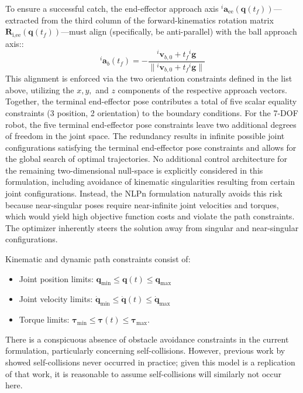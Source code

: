 To ensure a successful catch, the end-effector approach axis ${}^i \mathbf{a}_{\text{ee}}(\mathbf{q}(t_f))$—extracted from the third column of the forward-kinematics rotation matrix $\mathbf{R}_{\text{i,ee}}(\mathbf{q}(t_f))$—must align (specifically, be anti-parallel) with the ball approach axis::
\begin{equation}
    {}^i \mathbf{a}_b(t_f) = -\frac{{}^i \mathbf{v}_{b,0} + t_f {}^i \mathbf{g}}{\lVert {}^i \mathbf{v}_{b,0} + t_f {}^i \mathbf{g} \rVert}
\end{equation}
This alignment is enforced via the two orientation constraints defined in the list above, utilizing the $x, y,$ and $z$ components of the respective approach vectors. 
Together, the terminal end-effector pose contributes a total of five scalar equality constraints (3 position, 2 orientation) to the boundary conditions.
For the 7-\ac{DOF} robot, the five terminal end-effector pose constraints leave two additional degrees of freedom in the joint space.
The redundancy results in infinite possible joint configurations satisfying the terminal end-effector pose constraints and allows for the global search of optimal trajectories.
No additional control architecture for the remaining two-dimensional null-space is explicitly considered in this formulation, including avoidance of kinematic singularities resulting from certain joint configurations.
Instead, the \ac{NLPn} formulation naturally avoids this risk because near-singular poses require near-infinite joint velocities and torques, which would yield high objective function costs and violate the path constraints.
The optimizer inherently steers the solution away from singular and near-singular configurations.

Kinematic and dynamic path constraints consist of:
\begin{itemize}
    \item Joint position limits: $\mathbf{q}_{\min} \leq \mathbf{q}(t) \leq \mathbf{q}_{\max}$
    \item Joint velocity limits: $\dot{\mathbf{q}}_{\min} \leq \dot{\mathbf{q}}(t) \leq \dot{\mathbf{q}}_{\max}$
    \item Torque limits: $\boldsymbol{\tau}_{\min} \leq \boldsymbol{\tau}(t) \leq \boldsymbol{\tau}_{\max}$.
\end{itemize}
There is a conspicuous absence of obstacle avoidance constraints in the current formulation, particularly concerning self-collisions. 
However, previous work by \cite{Lampariello11} showed self-collisions never occurred in practice; given this model is a replication of that work, it is reasonable to assume self-collisions will similarly not occur here.

